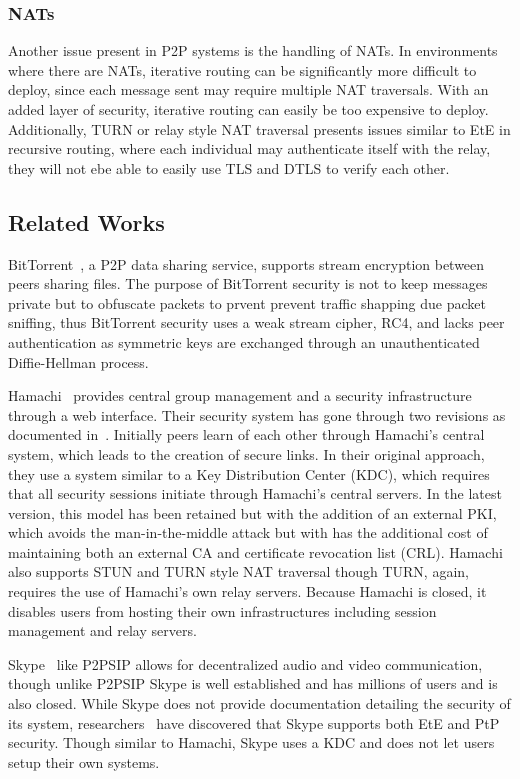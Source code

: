 \documentclass[conference]{IEEEtran}
\begin{document}
\subsubsection{NATs}
Another issue present in P2P systems is the handling of NATs.  In environments
where there are NATs, iterative routing can be significantly more difficult to
deploy, since each message sent may require multiple NAT traversals.  With an
added layer of security, iterative routing can easily be too expensive to
deploy.   Additionally, TURN or relay style NAT traversal presents issues
similar to EtE in recursive routing, where each individual may authenticate
itself with the relay, they will not ebe able to easily use TLS and DTLS to
verify each other.

\subsection{Related Works}
BitTorrent~\cite{bittorrent_security}, a P2P data sharing service,  supports
stream encryption between peers sharing files.  The purpose of BitTorrent
security is not to keep messages private but to obfuscate packets to prvent
prevent traffic shapping due packet sniffing, thus BitTorrent security uses a
weak stream cipher, RC4, and lacks peer authentication as symmetric keys are
exchanged through an unauthenticated Diffie-Hellman process.

Hamachi~\cite{hamachi} provides central group management and a security
infrastructure through a web interface.  Their security system has gone through
two revisions as documented in~\cite{hamachi_security}.  Initially peers learn
of each other through Hamachi's central system, which leads to the creation of
secure links.  In their original approach, they use a system similar to a Key
Distribution Center (KDC), which requires that all security sessions initiate
through Hamachi's central servers.  In the latest version, this model has been
retained but with the addition of an external PKI, which avoids the
man-in-the-middle attack but with has the additional cost of maintaining both
an external CA and certificate revocation list (CRL).  Hamachi also supports
STUN and TURN style NAT traversal though TURN, again, requires the use of
Hamachi's own relay servers.  Because Hamachi is closed, it disables users from
hosting their own infrastructures including session management and relay
servers.

Skype~\cite{skype} like P2PSIP allows for decentralized audio and video
communication, though unlike P2PSIP Skype is well established and has millions
of users and is also closed.  While Skype does not provide documentation
detailing the security of its system, researchers~\cite{skype_auth,
skype_overview} have discovered that Skype supports both EtE and PtP security.
Though similar to Hamachi, Skype uses a KDC and does not let users setup their
own systems.
\end{document}
